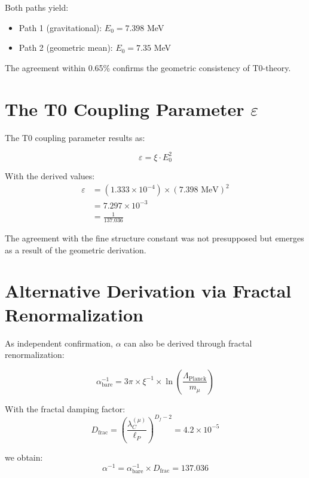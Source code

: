 \documentclass[12pt,a4paper]{article}
\begin{document}
	Both paths yield:
	\begin{itemize}
		\item Path 1 (gravitational): $E_0 = 7.398$ MeV
		\item Path 2 (geometric mean): $E_0 = 7.35$ MeV
	\end{itemize}
	
	The agreement within 0.65\% confirms the geometric consistency of T0-theory.
	
	\section{The T0 Coupling Parameter $\varepsilon$}
	
	The T0 coupling parameter results as:
	
	\begin{equation}
		\varepsilon = \xi \cdot E_0^2
	\end{equation}
	
	With the derived values:
	\begin{align}
		\varepsilon &= (1.333 \times 10^{-4}) \times (7.398 \text{ MeV})^2\\
		&= 7.297 \times 10^{-3}\\
		&= \frac{1}{137.036}
	\end{align}
	
	The agreement with the fine structure constant was not presupposed but emerges as a result of the geometric derivation.
	
	\section{Alternative Derivation via Fractal Renormalization}
	
	As independent confirmation, $\alpha$ can also be derived through fractal renormalization:
	
	\begin{equation}
		\alpha_{\text{bare}}^{-1} = 3\pi \times \xi^{-1} \times \ln\left(\frac{\Lambda_{\text{Planck}}}{m_\mu}\right)
	\end{equation}
	
	With the fractal damping factor:
	\begin{equation}
		D_{\text{frac}} = \left(\frac{\lambda_C^{(\mu)}}{\ell_P}\right)^{D_f-2} = 4.2 \times 10^{-5}
	\end{equation}
	
	we obtain:
	\begin{equation}
		\alpha^{-1} = \alpha_{\text{bare}}^{-1} \times D_{\text{frac}} = 137.036
	\end{equation}
	
\end{document}
